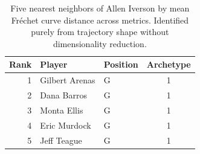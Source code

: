 \begin{table}[htbp]
  \centering\small
  \begin{tabular}{rllc}
    \toprule
    Rank & Player & Position & Archetype \\
    \midrule
    1 & Gilbert Arenas & G & 1 \\
    2 & Dana Barros & G & 1 \\
    3 & Monta Ellis & G & 1 \\
    4 & Eric Murdock & G & 1 \\
    5 & Jeff Teague & G & 1 \\
    \bottomrule
  \end{tabular}
  \caption{Five nearest neighbors of Allen Iverson by mean Fr\'{e}chet curve distance across metrics. Identified purely from trajectory shape without dimensionality reduction.}
  \label{tab:Allen_Iverson_frechet_curve_neighbors}
\end{table}

